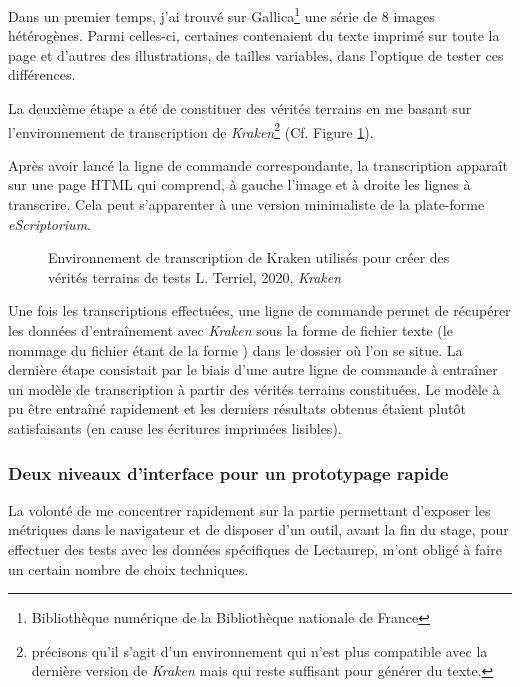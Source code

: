 Dans un premier temps, j'ai trouvé sur Gallica\footnote{Bibliothèque numérique de la Bibliothèque nationale de France} une série de 8 images hétérogènes. Parmi celles-ci, certaines contenaient du texte imprimé sur toute la page et d'autres des illustrations, de tailles variables, dans l'optique de tester ces différences. 

La deuxième étape a été de constituer des vérités terrains en me basant sur l'environnement de transcription de \textit{Kraken}\footnote{précisons qu'il s'agit d'un environnement  qui n'est plus compatible avec la dernière version de \textit{Kraken} mais qui reste suffisant pour générer du texte.} (Cf. Figure \ref{fig:transcrire_kraken}). 

Après avoir lancé la ligne de commande correspondante, la transcription apparaît sur une page HTML qui comprend, à gauche l'image et à droite les lignes à transcrire. Cela peut s'apparenter à une version minimaliste de la plate-forme \textit{eScriptorium}.   

\begin{figure}[H]
    \centering
    \centerline{}
    \caption{Environnement de transcription de Kraken utilisés pour créer des vérités terrains de tests \textcopyright L. Terriel, 2020, \textit{Kraken}}
    \label{fig:transcrire_kraken}
\end{figure}

Une fois les transcriptions effectuées, une ligne de commande permet de récupérer les données d'entraînement avec \textit{Kraken} sous la forme de fichier texte (le nommage du fichier étant de la forme ) dans le dossier où l'on se situe. La dernière étape consistait par le biais d'une autre ligne de commande à entraîner un modèle de transcription à partir des vérités terrains constituées. Le modèle à pu être entraîné rapidement et les derniers résultats obtenus étaient plutôt satisfaisants (en cause les écritures imprimées lisibles). 

\subsubsection{Deux niveaux d'interface pour un prototypage rapide}

La volonté de me concentrer rapidement sur la partie permettant d'exposer les métriques dans le navigateur et de disposer d'un outil, avant la fin du stage, pour effectuer des tests avec les données spécifiques de Lectaurep, m'ont obligé à faire un certain nombre de choix techniques. 

